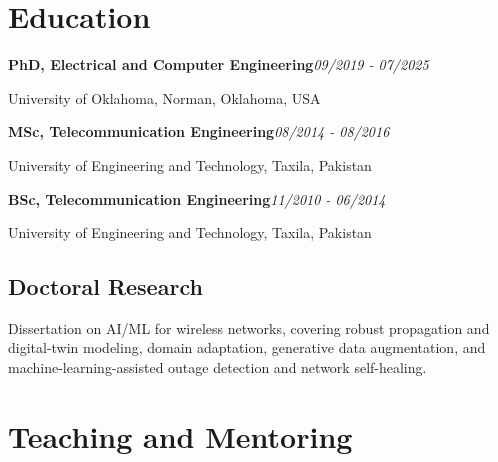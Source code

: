 \documentclass[9pt,letterpaper]{extarticle}
\newcommand{\entry}[2]{\Needspace{4\baselineskip}\textbf{#1}\hfill\textit{#2}\par}
\begin{document}
\section{Education}
\entry{PhD, Electrical and Computer Engineering}{09/2019 - 07/2025}
University of Oklahoma, Norman, Oklahoma, USA\par
\entry{MSc, Telecommunication Engineering}{08/2014 - 08/2016}
University of Engineering and Technology, Taxila, Pakistan\par
\entry{BSc, Telecommunication Engineering}{11/2010 - 06/2014}
University of Engineering and Technology, Taxila, Pakistan\par
{}
\subsection{Doctoral Research}
Dissertation on AI/ML for wireless networks, covering robust propagation and digital-twin modeling, domain adaptation, generative data augmentation, and machine-learning-assisted outage detection and network self-healing.\par
{}
\section{Teaching and Mentoring}
\end{document}
